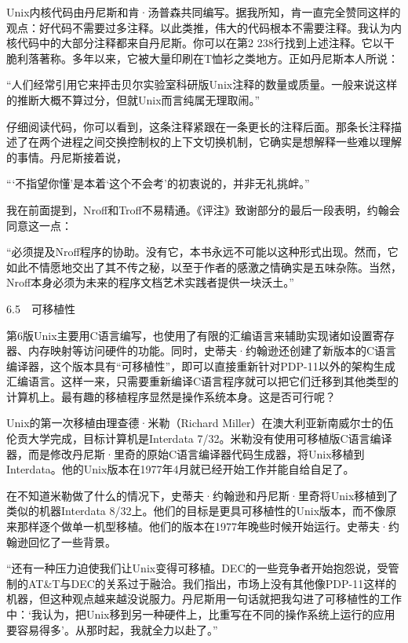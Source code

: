 \documentclass[a4paper,12pt,UTF8,twoside]{ctexbook}
\begin{document}
Unix内核代码由丹尼斯和肯·汤普森共同编写。据我所知，肯一直完全赞同这样的观点：好代码不需要过多注释。以此类推，伟大的代码根本不需要注释。我认为内核代码中的大部分注释都来自丹尼斯。你可以在第2 238行找到上述注释。它以干脆利落著称。多年以来，它被大量印刷在T恤衫之类地方。正如丹尼斯本人所说：

“人们经常引用它来抨击贝尔实验室科研版Unix注释的数量或质量。一般来说这样的推断大概不算过分，但就Unix而言纯属无理取闹。”



仔细阅读代码，你可以看到，这条注释紧跟在一条更长的注释后面。那条长注释描述了在两个进程之间交换控制权的上下文切换机制，它确实是想解释一些难以理解的事情。丹尼斯接着说，

“‘不指望你懂’是本着‘这个不会考’的初衷说的，并非无礼挑衅。”



我在前面提到，Nroff和Troff不易精通。《评注》致谢部分的最后一段表明，约翰会同意这一点：

“必须提及Nroff程序的协助。没有它，本书永远不可能以这种形式出现。然而，它如此不情愿地交出了其不传之秘，以至于作者的感激之情确实是五味杂陈。当然，Nroff本身必须为未来的程序文档艺术实践者提供一块沃土。”





6.5　可移植性


第6版Unix主要用C语言编写，也使用了有限的汇编语言来辅助实现诸如设置寄存器、内存映射等访问硬件的功能。同时，史蒂夫·约翰逊还创建了新版本的C语言编译器，这个版本具有“可移植性”，即可以直接重新针对PDP-11以外的架构生成汇编语言。这样一来，只需要重新编译C语言程序就可以把它们迁移到其他类型的计算机上。最有趣的移植程序显然是操作系统本身。这是否可行呢？

Unix的第一次移植由理查德·米勒（Richard Miller）在澳大利亚新南威尔士的伍伦贡大学完成，目标计算机是Interdata 7/32。米勒没有使用可移植版C语言编译器，而是修改丹尼斯·里奇的原始C语言编译器代码生成器，将Unix移植到Interdata。他的Unix版本在1977年4月就已经开始工作并能自给自足了。

在不知道米勒做了什么的情况下，史蒂夫·约翰逊和丹尼斯·里奇将Unix移植到了类似的机器Interdata 8/32上。他们的目标是更具可移植性的Unix版本，而不像原来那样逐个做单一机型移植。他们的版本在1977年晚些时候开始运行。史蒂夫·约翰逊回忆了一些背景。

“还有一种压力迫使我们让Unix变得可移植。DEC的一些竞争者开始抱怨说，受管制的AT\&T与DEC的关系过于融洽。我们指出，市场上没有其他像PDP-11这样的机器，但这种观点越来越没说服力。丹尼斯用一句话就把我勾进了可移植性的工作中：‘我认为，把Unix移到另一种硬件上，比重写在不同的操作系统上运行的应用要容易得多’。从那时起，我就全力以赴了。”
\end{document}
